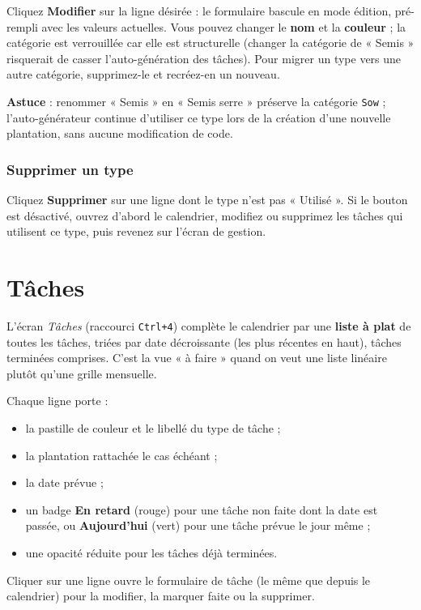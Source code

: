 Cliquez \textbf{Modifier} sur la ligne désirée : le formulaire bascule en mode édition, pré-rempli avec les valeurs actuelles. Vous pouvez changer le \textbf{nom} et la \textbf{couleur} ; la catégorie est verrouillée car elle est structurelle (changer la catégorie de « Semis » risquerait de casser l'auto-génération des tâches). Pour migrer un type vers une autre catégorie, supprimez-le et recréez-en un nouveau.

\textbf{Astuce} : renommer « Semis » en « Semis serre » préserve la catégorie \texttt{Sow} ; l'auto-générateur continue d'utiliser ce type lors de la création d'une nouvelle plantation, sans aucune modification de code.

\subsection*{Supprimer un type}

Cliquez \textbf{Supprimer} sur une ligne dont le type n'est pas « Utilisé ». Si le bouton est désactivé, ouvrez d'abord le calendrier, modifiez ou supprimez les tâches qui utilisent ce type, puis revenez sur l'écran de gestion.

\chapter{Tâches}
\label{chap:taches}

L'écran \emph{Tâches} (raccourci \texttt{Ctrl+4}) complète le calendrier par une \textbf{liste à plat} de toutes les tâches, triées par date décroissante (les plus récentes en haut), tâches terminées comprises. C'est la vue « à faire » quand on veut une liste linéaire plutôt qu'une grille mensuelle.

Chaque ligne porte :

\begin{itemize}
  \item la pastille de couleur et le libellé du type de tâche ;
  \item la plantation rattachée le cas échéant ;
  \item la date prévue ;
  \item un badge \textbf{En retard} (rouge) pour une tâche non faite dont la date est passée, ou \textbf{Aujourd'hui} (vert) pour une tâche prévue le jour même ;
  \item une opacité réduite pour les tâches déjà terminées.
\end{itemize}

Cliquer sur une ligne ouvre le formulaire de tâche (le même que depuis le calendrier) pour la modifier, la marquer faite ou la supprimer.
